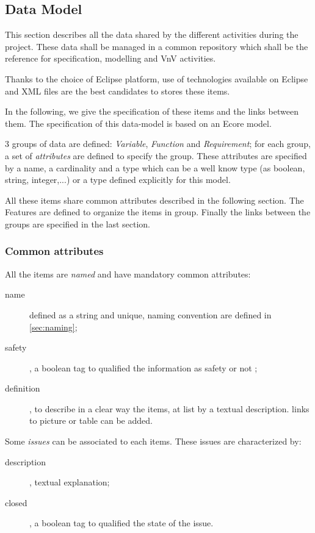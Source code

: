 \subsection{Data Model}
\label{sec:datamodel}

This section describes all the data shared by the different activities during the project.
These data shall be managed in a common repository which shall be the reference for specification, modelling and VnV activities.

Thanks to the choice of Eclipse platform, use of technologies available on Eclipse and XML files are the best candidates to stores these items.

In the following, we give the specification of these items and the links between them. The specification of this data-model is based on an Ecore model.

3 groups of data are defined: \emph{Variable}, \emph{Function} and \emph{Requirement}; for each group, a set of \emph{attributes} are defined to specify the group. These attributes are specified by a name, a cardinality and a type which can be a well  know type  (as boolean, string, integer,...) or a type defined explicitly for this model.

All these items share common attributes described in the following section. The Features are defined to organize the items in group.
Finally the links between the groups are specified in the last section.


\subsubsection{Common attributes}

All the items are \textit{named} and have mandatory common attributes:
\begin{description}
\item [name] defined as a string and unique, naming convention are defined in \ref{sec:naming};
\item[safety], a boolean tag to qualified the information as safety or not ;
\item[definition], to describe in a clear way the items, at list by a textual description. links to picture or table can be added.
\end{description}

Some \textit{issues} can be associated to  each items. These issues are characterized by:
\begin{description}
\item[description], textual explanation;
\item[closed], a boolean tag to qualified the state of the issue.
\end{description}

